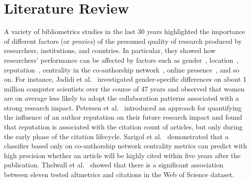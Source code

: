 \documentclass{llncs}
\begin{document}
\section{Literature Review}
\label{sec:sota}
A variety of bibliometrics studies in the last 30 years highlighted the importance of different factors (or \textit{proxies}) of the presumed quality of research produced by researchers, institutions, and countries. 
In particular, they showed how researchers' performance can be affected by factors such as gender~\cite{Jadidi2017}, location~\cite{frenken2009}, reputation~\cite{petersen2014reputation}, centrality in the co-authorship network~\cite{sarigol2014predicting}, online presence~\cite{thelwall2013altmetrics}, and so on. 
For instance, Jadidi et al.~\cite{Jadidi2017} investigated gender-specific differences on about 1 million computer scientists over the course of 47 years and observed that women are on average less likely to adopt the collaboration patterns associated with a strong research impact. Petersen et al.~\cite{petersen2014reputation} introduced an approach for quantifying the influence of an author reputation on their future research impact and found that reputation is associated with the citation count of articles, but only during the early phase of the citation lifecycle. Sarigol et al.~\cite{sarigol2014predicting} demonstrated that a classifier based only on co-authorship network centrality metrics can predict with high precision whether an article will be highly cited within five years after the publication. Thelwall et al.~\cite{thelwall2013altmetrics} showed that there is a significant association between eleven tested altmetrics and citations in the Web of Science dataset.
\end{document}
